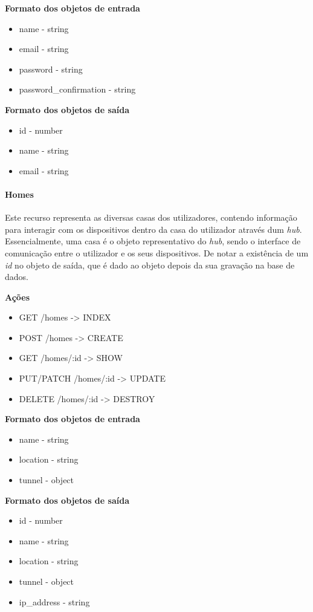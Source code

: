 \textbf{Formato dos objetos de entrada}
\begin{itemize}
    \item name - string
    \item email - string
    \item password - string
    \item password{\_}confirmation - string
\end{itemize}

\textbf{Formato dos objetos de saída}
\begin{itemize}
    \item id - number
    \item name - string
    \item email - string
\end{itemize}

\paragraph*{Homes}

Este recurso representa as diversas casas dos utilizadores, contendo informação para interagir com os dispositivos dentro da casa do utilizador através dum \textit{hub}. Essencialmente, uma casa é o objeto representativo do \textit{hub}, sendo o interface de comunicação entre o utilizador e os seus dispositivos. De notar a existência de um \textit{id} no objeto de saída, que é dado ao objeto depois da sua gravação na base de dados.

\textbf{Ações}
\begin{itemize}
    \item GET /homes -> INDEX
    \item POST /homes -> CREATE
    \item GET /homes/:id -> SHOW
    \item PUT/PATCH /homes/:id -> UPDATE
    \item DELETE /homes/:id -> DESTROY
\end{itemize}

\textbf{Formato dos objetos de entrada}
\begin{itemize}
    \item name - string
    \item location - string
    \item tunnel - object
\end{itemize}

\textbf{Formato dos objetos de saída}
\begin{itemize}
    \item id - number
    \item name - string
    \item location - string
    \item tunnel - object
    \item ip{\_}address - string
\end{itemize}

